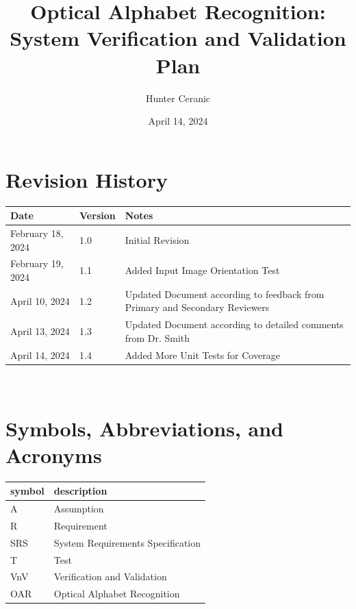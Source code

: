 \documentclass[12pt, titlepage]{article}
\begin{document}
\title{Optical Alphabet Recognition: System Verification and Validation Plan} 
\author{Hunter Ceranic}
\date{April 14, 2024}
	
\maketitle


\section*{Revision History}

\begin{tabularx}{\textwidth}{p{3cm}p{2cm}X}
\toprule {\bf Date} & {\bf Version} & {\bf Notes}\\
\midrule
February 18, 2024 & 1.0 & Initial Revision\\
February 19, 2024 & 1.1 & Added Input Image Orientation Test\\
April 10, 2024 & 1.2 & Updated Document according to feedback from Primary and Secondary Reviewers\\
April 13, 2024 & 1.3 & Updated Document according to detailed comments from Dr. Smith\\
April 14, 2024 & 1.4 & Added More Unit Tests for Coverage\\
\bottomrule
\end{tabularx}

~\\

\newpage

\tableofcontents

\newpage

\section{Symbols, Abbreviations, and Acronyms}

\renewcommand{\arraystretch}{1.2}
\begin{tabular}{l l} 
  \toprule		
  \textbf{symbol} & \textbf{description}\\
  \midrule 
  A & Assumption\\
  R & Requirement\\
  SRS & System Requirements Specification\\
  T & Test\\
  VnV & Verification and Validation\\
  OAR & Optical Alphabet Recognition\\
  \bottomrule
\end{tabular}\\
\end{document}
